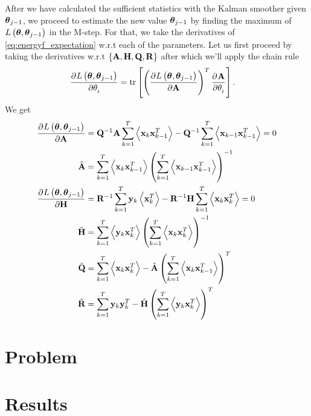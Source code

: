 \documentclass[12pt,a4paper,oneside,article]{memoir}
\begin{document}
After we have calculated the sufficient statistics with the Kalman
smoother given $\boldsymbol{\theta}_{j-1}$, we proceed to estimate the new
value $\boldsymbol{\theta}_{j-1}$ by finding the maximum of
$L\left(\boldsymbol{\theta},\boldsymbol{\theta}_{j-1}\right)$ in the M-step. For that,
we take the derivatives of \eqref{eq:energyf_expectation} w.r.t each of the
parameters. Let us first proceed by taking the derivatives w.r.t
$\left\{\mathbf{A},\mathbf{H},\mathbf{Q},\mathbf{R}\right\}$ after which we'll apply
the chain rule
\begin{align}
	\dpd{L\left(\gv{\theta},\gv{\theta}_{j-1}\right)}{\theta_i}&=\mathrm{tr}\left[\left(\dpd{L\left(\gv{\theta},\gv{\theta}_{j-1}\right)}{\v{A}}\right)^T\dpd{\v{A}}{\theta_i}\right].
\end{align}
We get
\begin{align}
	\dpd{L\left(\gv{\theta},\gv{\theta}_{j-1}\right)}{\v{A}}&=\v{Q}^{-1}\v{A}\sum_{k=1}^T\E{\v{x}_{k}\v{x}_{k-1}^T}-\v{Q}^{-1}\sum_{k=1}^T\E{\v{x}_{k-1}\v{x}_{k-1}^T}=0\\
	\hat{\v{A}}&=\sum_{k=1}^T\E{\v{x}_{k}\v{x}_{k-1}^T}\left(\sum_{k=1}^T\E{\v{x}_{k-1}\v{x}_{k-1}^T}\right)^{-1}\\ 
	\dpd{L\left(\gv{\theta},\gv{\theta}_{j-1}\right)}{\v{H}}&=\v{R}^{-1}\sum_{k=1}^T\v{y}_k\E{\v{x}_{k}^T}-\v{R}^{-1}\v{H}\sum_{k=1}^T\E{\v{x}_{k}\v{x}_{k}^T}=0\\
	\hat{\v{H}}&=\sum_{k=1}^T\E{\v{y}_{k}\v{x}_{k}^T}\left(\sum_{k=1}^T\E{\v{x}_{k}\v{x}_{k}^T}\right)^{-1}\\ 
	\hat{\v{Q}}&=\sum_{k=1}^T\E{\v{x}_{k}\v{x}_{k}^T}-\hat{\v{A}}\left(\sum_{k=1}^T\E{\v{x}_{k}\v{x}_{k-1}^T}\right)^T\\ 
	\hat{\v{R}}&=\sum_{k=1}^T\v{y}_{k}\v{y}_{k}^T-\hat{\v{H}}\left(\sum_{k=1}^T\E{\v{y}_{k}\v{x}_{k}^T}\right)^T 
\end{align}

























\section{Problem}
\section{Results}


%
%
\end{document}
